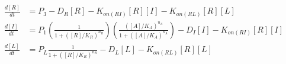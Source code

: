\documentclass{article}
\begin{document}
\Large
\begin{align*}
    \frac{d[R]}{dt} &= P_{3}  - D_{R}  [R] - K_{on(RI)} [R] [I] - K_{on(RL)}[R][L]  \\
    \frac{d[I]}{dt} &= P_{1}\left(\frac{1}{1 + ([R]/K_R)^{n_R}}\right)\left(\frac{([A]/K_A)^{n_A}}{1 + ([A]/K_A)^{n_A}}\right) - D_{I}  [I] - K_{on(RI)} [R] [I]    \\
    \frac{d[L]}{dt} &= P_{L}\frac{1}{1 + ([R]/K_{R})^{n_{R}}}   - D_{L}  [L] - K_{on(RL)}  [R][L]
\end{align*}
\end{document}

